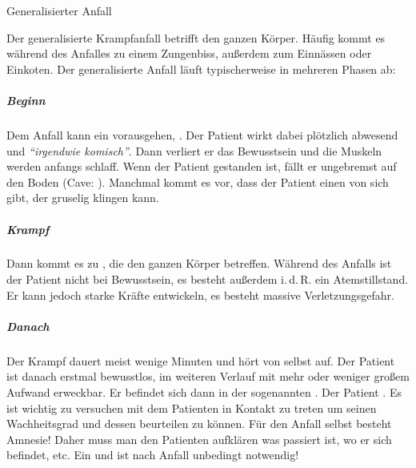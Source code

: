 {Generalisierter Anfall}
{%
\label{topic:krampfanfall-generalisierter}
Der generalisierte Krampfanfall  betrifft den ganzen Körper. Häufig kommt es während des Anfalles zu einem Zungenbiss,
außerdem zum Einnässen oder Einkoten. 
Der generalisierte Anfall läuft typischerweise in mehreren Phasen ab:

\subparagraph{Beginn}
Dem Anfall kann ein
vorausgehen, . Der Patient wirkt
dabei plötzlich abwesend und \emph{\enquote{irgendwie komisch}}.
Dann verliert er das Bewusstsein und die Muskeln werden
anfangs schlaff. Wenn der Patient gestanden ist, fällt er
ungebremst auf den Boden (Cave: ).
Manchmal kommt es vor, dass der Patient einen
 von sich gibt, der
gruselig klingen kann. 

\subparagraph{Krampf}
Dann kommt es zu
,
die den ganzen Körper betreffen. Während des Anfalls ist der
Patient nicht bei Bewusstsein, es besteht außerdem i.\,d.\,R.
ein Atemstillstand. Er kann jedoch starke Kräfte entwickeln, es
besteht massive
Verletzungsgefahr.

\subparagraph{Danach}
Der Krampf dauert meist wenige Minuten und hört von selbst
auf. Der Patient ist danach erstmal bewusstlos, im weiteren
Verlauf mit mehr oder weniger großem Aufwand erweckbar. Er
befindet sich dann in der sogenannten
.
Der Patient . Es ist
wichtig zu versuchen mit dem Patienten in Kontakt zu treten
um seinen Wachheitsgrad und dessen
 beurteilen zu können. Für den Anfall selbst besteht
Amnesie! Daher muss man den Patienten aufklären was passiert
ist, wo er sich befindet, etc. Ein  und
 ist nach \underline{} Anfall
unbedingt notwendig! 
}
